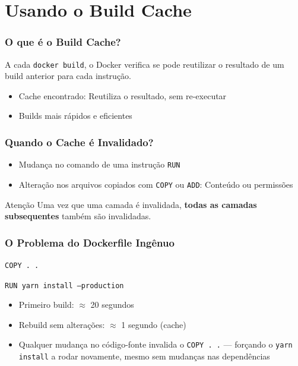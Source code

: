 \section{Usando o Build Cache}

\begin{frame}
  \frametitle{O que é o Build Cache?}
  A cada \texttt{docker build}, o Docker verifica se pode reutilizar
  o resultado de um build anterior para cada instrução.

  \vspace{0.5em}
  \begin{itemize}
    \item Cache encontrado: Reutiliza o resultado, sem re-executar
    \item Builds mais rápidos e eficientes
  \end{itemize}
\end{frame}

\begin{frame}
  \frametitle{Quando o Cache é Invalidado?}
  \begin{itemize}
    \item Mudança no comando de uma instrução \texttt{RUN}
    \item Alteração nos arquivos copiados com \texttt{COPY} ou \texttt{ADD}: Conteúdo ou permissões
  \end{itemize}

  \vspace{0.5em}
  \begin{alertblock}{Atenção}
    Uma vez que uma camada é invalidada, \textbf{todas as camadas subsequentes}
    também são invalidadas.
  \end{alertblock}
\end{frame}

\begin{frame}
  \frametitle{O Problema do Dockerfile Ingênuo}
  \texttt{COPY . .}

  \texttt{RUN yarn install --production}

  \vspace{0.5em}
  \begin{itemize}
    \item Primeiro build: $\approx$ 20 segundos
    \item Rebuild sem alterações: $\approx$ 1 segundo (cache)
    \item Qualquer mudança no código-fonte invalida o \texttt{COPY . .}
          — forçando o \texttt{yarn install} a rodar novamente, mesmo sem
          mudanças nas dependências
  \end{itemize}
\end{frame}

